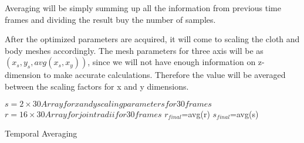 Averaging will be simply summing up all the information from previous time frames and dividing the result buy the number of samples.

After the optimized parameters are acquired, it will come to scaling the cloth and body meshes accordingly. The mesh parameters for three axis will be as $(x_s,y_s,avg(x_s,x_y))$, since we will not have enough information on z-dimension to make accurate calculations.  Therefore the value will be averaged between the scaling factors for x and y dimensions.

\begin{algorithm}
\dontprintsemicolon %
$s=2 \times 30 Array for x and y scaling parameters for 30 frames$ \;
$r=16 \times 30 Array for joint radii for 30 frames$\;
$r_{final}$=avg(r)\;
$s_{final}$=avg(s)\;
\caption{Temporal Averaging}
\label{algo:temporal_averaging}
\end{algorithm}